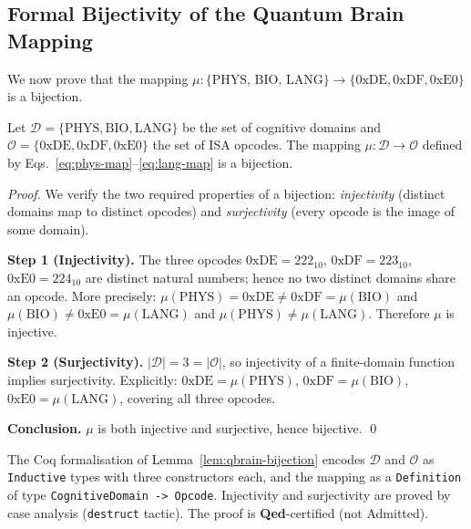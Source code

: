 \subsection{Formal Bijectivity of the Quantum Brain Mapping}

We now prove that the mapping $\mu: \{\text{PHYS, BIO, LANG}\} \to \{0\text{xDE},0\text{xDF},0\text{xE0}\}$
is a bijection.

\begin{lemma}
  \label{lem:qbrain-bijection}
  Let $\mathcal{D} = \{\mathrm{PHYS}, \mathrm{BIO}, \mathrm{LANG}\}$ be the set of
  cognitive domains and
  $\mathcal{O} = \{0\mathrm{xDE}, 0\mathrm{xDF}, 0\mathrm{xE0}\}$ the set of
  ISA opcodes.
  The mapping $\mu: \mathcal{D} \to \mathcal{O}$ defined by
  Eqs.~\eqref{eq:phys-map}--\eqref{eq:lang-map}
  is a bijection.
\end{lemma}

\begin{proof}
  We verify the two required properties of a bijection:
  \emph{injectivity} (distinct domains map to distinct opcodes) and
  \emph{surjectivity} (every opcode is the image of some domain).

  \textbf{Step 1 (Injectivity).}
  The three opcodes $0\text{xDE} = 222_{10}$, $0\text{xDF} = 223_{10}$,
  $0\text{xE0} = 224_{10}$ are distinct natural numbers; hence no two
  distinct domains share an opcode.
  More precisely: $\mu(\mathrm{PHYS}) = 0\text{xDE} \neq 0\text{xDF} = \mu(\mathrm{BIO})$
  and $\mu(\mathrm{BIO}) \neq 0\text{xE0} = \mu(\mathrm{LANG})$
  and $\mu(\mathrm{PHYS}) \neq \mu(\mathrm{LANG})$.
  Therefore $\mu$ is injective.

  \textbf{Step 2 (Surjectivity).}
  $|\mathcal{D}| = 3 = |\mathcal{O}|$, so injectivity of a finite-domain
  function implies surjectivity.  Explicitly:
  $0\text{xDE} = \mu(\mathrm{PHYS})$,
  $0\text{xDF} = \mu(\mathrm{BIO})$,
  $0\text{xE0} = \mu(\mathrm{LANG})$,
  covering all three opcodes.

  \textbf{Conclusion.}
  $\mu$ is both injective and surjective, hence bijective. \qed
\end{proof}


\begin{remark}
  The Coq formalisation of Lemma~\ref{lem:qbrain-bijection} encodes
  $\mathcal{D}$ and $\mathcal{O}$ as \texttt{Inductive} types with three
  constructors each, and the mapping as a \texttt{Definition} of type
  \texttt{CognitiveDomain -> Opcode}.
  Injectivity and surjectivity are proved by case analysis (\texttt{destruct} tactic).
  The proof is \textbf{Qed}-certified (not Admitted).
\end{remark}


